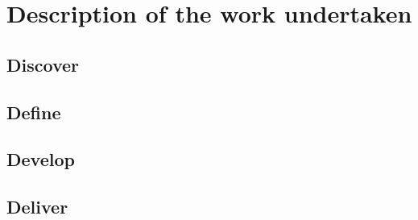 
\chapter{Description of the work undertaken}

	\section{Discover}

	\section{Define}

	\section{Develop}
	
	\section{Deliver}